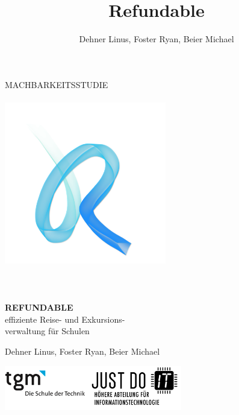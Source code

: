 \documentclass[minted, notitle]{protocol}
\title{Refundable}
\author{Dehner Linus, Foster Ryan, Beier Michael}
\begin{document}
\begin{titlepage} %
	\raggedleft %
	
	\begingroup \color{gray}{\rule{3pt}{\textheight}} \endgroup %
	\hspace{0.05\textwidth} %
	\parbox[b]{0.75\textwidth}{ %
		{{\fontsize{27}{48} \selectfont  MACHBARKEITSSTUDIE}}  \\ \\
		\includegraphics[width=200pt]{images/refundable_logo_klein.png} \\ \\ \\ \\
		{{\fontsize{50}{40} \bfseries \color{Cyan} REFUNDABLE}} \\[0.5\baselineskip] %
		{{\fontsize{20}{48} \selectfont effiziente Reise- und Exkursions-\\verwaltung für Schulen}} \\ [0.5\baselineskip] %
		{\vspace{-0.5cm}\large \begin{flushleft}Dehner Linus, Foster Ryan, Beier Michael\end{flushleft}} %
		{\vspace{0.3cm}\includegraphics[width=220pt]{images/tgm_full.png}}
	}
\end{titlepage}
\end{document}
